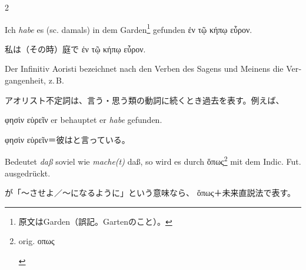 \begin{paracol}{2}
\begin{enumerate}[leftmargin=0pt,rightmargin=0pt,listparindent =1cm,labelindent=1cm,labelsep=1ex,labelwidth={*},itemindent={*},align=left]
\begin{continuousexamples}
\begin{german}
Ich \emph{habe} es (\textlatin{sc.} damals) in dem Garden\footnote{\textjapanese{原文はGarden（誤記。Gartenのこと）。}} gefunden
\textgreek[variant=ancient]{ἐν τῷ κήπῳ εὗρον. }
\end{german}
\switchcolumn

\begin{japanese}
私は（その時）庭で \textgreek[variant=ancient]{ἐν τῷ κήπῳ εὗρον.}
\end{japanese}
\switchcolumn*
\end{continuousexamples}

\begin{german}
\item Der Infinitiv Aoristi bezeichnet nach den Verben des Sagens und Meinens
die Vergangenheit, z.\,B.
\end{german}
\switchcolumn

\begin{japanese}
アオリスト不定詞は、言う・思う類の動詞に続くとき過去を表す。例えば、
\end{japanese}
\switchcolumn*

\begin{continuousexamples}
\begin{german}
\textgreek[variant=ancient]{φησὶν εὑρεῖν}
er behauptet er \emph{habe} gefunden.
\end{german}
\switchcolumn

\begin{japanese}
\textgreek[variant=ancient]{φησὶν εὑρεῖν}＝彼はと言っている。
\end{japanese}
\switchcolumn*
\end{continuousexamples}

\begin{german}
\item Bedeutet \emph{daß} soviel wie \emph{mache(t)} daß, so wird es durch
\textgreek[variant=ancient]{ὅπως}\footnote{\begin{latin}%
orig. \textgreek[variant=ancient]{οπως}\end{latin}%
} mit dem \textlatin{Indic. Fut.} ausgedrückt.
\end{german}
\switchcolumn

\begin{japanese}
 が「〜させよ／〜になるように」という意味なら、
\textgreek[variant=ancient]{ὅπως}＋未来直説法で表す。
\end{japanese}
\switchcolumn*


\end{enumerate}
\end{paracol}
